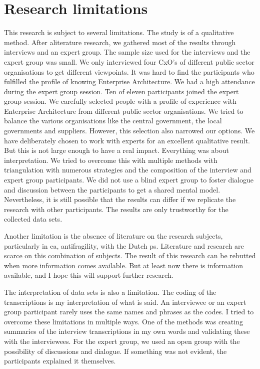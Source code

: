 \section{Research limitations}
\label{sec:limitations}
This research is subject to several limitations. The study is of a qualitative method. After aliterature research, we gathered most of the results through interviews and an expert group. The sample size used for the interviews and the expert group was small. We only interviewed four CxO's of different public sector organisations to get different viewpoints. It was hard to find the participants who fulfilled the profile of knowing Enterprise Architecture. We had a high attendance during the expert group session. Ten of eleven participants joined the expert group session. We carefully selected people with a profile of experience with Enterprise Architecture from different public sector organisations. We tried to balance the various organisations like the central government, the local governments and suppliers. However, this selection also narrowed our options. We have deliberately chosen to work with experts for an excellent qualitative result. But this is not large enough to have a real impact. Everything was about interpretation. We tried to overcome this with multiple methods with triangulation with numerous strategies and the composition of the interview and expert group participants. We did not use a blind expert group to foster dialogue and discussion between the participants to get a shared mental model. Nevertheless, it is still possible that the results can differ if we replicate the research with other participants. The results are only trustworthy for the collected data sets. 

Another limitation is the absence of literature on the research subjects, particularly in \acrlong{ea}, \gls{antifragility}, with the Dutch \gls{ps}. Literature and research are scarce on this combination of subjects. The result of this research can be rebutted when more information comes available. But at least now there is information available, and I hope this will support further research.

The interpretation of data sets is also a limitation. The coding of the transcriptions is my interpretation of what is said. An interviewee or an expert group participant rarely uses the same names and phrases as the codes. I tried to overcome these limitations in multiple ways. One of the methods was creating summaries of the interview transcriptions in my own words and validating these with the interviewees. For the expert group, we used an open group with the possibility of discussions and dialogue. If something was not evident, the participants explained it themselves.

